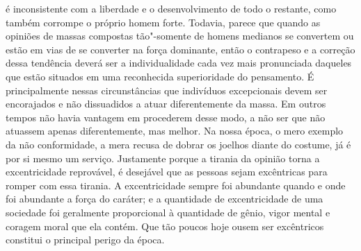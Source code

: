 é inconsistente com a liberdade e o desenvolvimento de todo o restante,
como também corrompe o próprio homem forte. Todavia, parece que quando
as opiniões de massas compostas tão"-somente de homens medianos se
convertem ou estão em vias de se converter na força dominante, então o
contrapeso e a correção dessa tendência deverá ser a individualidade
cada vez mais pronunciada daqueles que estão situados em uma
reconhecida superioridade do pensamento. É principalmente nessas
circunstâncias que indivíduos excepcionais devem ser encorajados e não
dissuadidos a atuar diferentemente da massa. Em outros tempos não havia
vantagem em procederem desse modo, a não ser que não atuassem apenas
diferentemente, mas melhor. Na nossa época, o mero exemplo da não
conformidade, a mera recusa de dobrar os joelhos diante do costume, já
é por si mesmo um serviço. Justamente porque a tirania da opinião torna
a excentricidade reprovável, é desejável que as pessoas sejam
excêntricas para romper com essa tirania. A excentricidade sempre foi
abundante quando e onde foi abundante a força do caráter; e a
quantidade de excentricidade de uma sociedade foi geralmente
proporcional à quantidade de gênio, vigor mental e coragem moral que
ela contém. Que tão poucos hoje ousem ser excêntricos constitui o
principal perigo da época.

